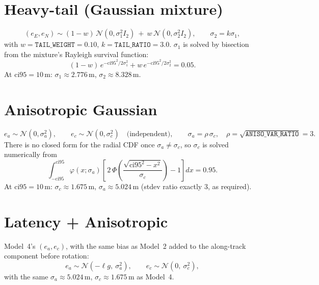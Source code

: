 \documentclass[11pt]{article}
\newcommand{\ci}{\mathrm{ci95}}
\begin{document}
\section{Heavy-tail (Gaussian mixture)}
\begin{equation}
  (e_E, e_N) \sim (1-w)\,\mathcal{N}(0, \sigma_1^2 I_2)
              \ +\ w\,\mathcal{N}(0, \sigma_2^2 I_2), \qquad
  \sigma_2 = k\sigma_1,
\end{equation}
with $w = \texttt{TAIL\_WEIGHT} = 0.10$, $k = \texttt{TAIL\_RATIO} = 3.0$.
$\sigma_1$ is solved by bisection from the mixture's Rayleigh survival
function:
\begin{equation}
  (1-w)\,e^{-\ci^2 / 2\sigma_1^2} + w\,e^{-\ci^2 / 2\sigma_2^2} = 0.05.
\end{equation}
At $\ci = 10$\,m: $\sigma_1 \approx 2.776$\,m, $\sigma_2 \approx 8.328$\,m.

\section{Anisotropic Gaussian}
\begin{equation}
  e_a \sim \mathcal{N}(0, \sigma_a^2), \qquad
  e_c \sim \mathcal{N}(0, \sigma_c^2) \quad \text{(independent)}, \qquad
  \sigma_a = \rho\,\sigma_c, \quad \rho = \sqrt{\texttt{ANISO\_VAR\_RATIO}} = 3.
\end{equation}
There is no closed form for the radial CDF once $\sigma_a \ne \sigma_c$, so
$\sigma_c$ is solved numerically from
\begin{equation}
  \int_{-\ci}^{\ci} \varphi(x; \sigma_a)
    \left[\, 2\,\Phi\!\left(\frac{\sqrt{\ci^2 - x^2}}{\sigma_c}\right) - 1 \right] dx
  = 0.95.
  \label{eq:radial-cdf}
\end{equation}
At $\ci = 10$\,m: $\sigma_c \approx 1.675$\,m, $\sigma_a \approx 5.024$\,m
(stdev ratio exactly 3, as required).

\section{Latency + Anisotropic}
Model~4's $(e_a, e_c)$, with the same bias as Model~2 added to the
along-track component before rotation:
\begin{equation}
  e_a \sim \mathcal{N}(-\ell g,\ \sigma_a^2), \qquad
  e_c \sim \mathcal{N}(0,\ \sigma_c^2),
\end{equation}
with the same $\sigma_a \approx 5.024$\,m, $\sigma_c \approx 1.675$\,m as
Model~4.
\end{document}
